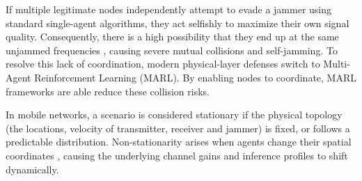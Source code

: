 \documentclass[conference]{IEEEtran}
\newcommand{\adm}[1]{{\color{orange}{[#1]}}}
\newcommand{\rar}[1]{{\color{blue}{[#1]}}}
\begin{document}
If multiple legitimate nodes independently attempt to evade a jammer using standard single-agent algorithms, they act selfishly to maximize their own signal quality.
Consequently, there is a high possibility that they end up at the same unjammed frequencies 
, causing severe mutual collisions and self-jamming.
To resolve this lack of coordination, modern physical-layer defenses switch to Multi-Agent Reinforcement Learning (MARL). 
By enabling nodes to coordinate, MARL frameworks are able reduce these collision risks.
 
In mobile networks, a scenario is considered stationary if the physical topology (the locations, velocity of transmitter, receiver and jammer) is fixed, or follows a predictable distribution.
Non-stationarity arises when agents change their spatial coordinates \adm{there are various other forms of non-stationarity beyond just position change. actually, mobile scenarios could also be seen stationary if the parameters that regulate movement (e.g., speed, model) do not change over time}
\rar{maybe decide on other form of non-stationarity? research}
, causing the underlying channel gains and inference profiles to shift dynamically.
\end{document}
